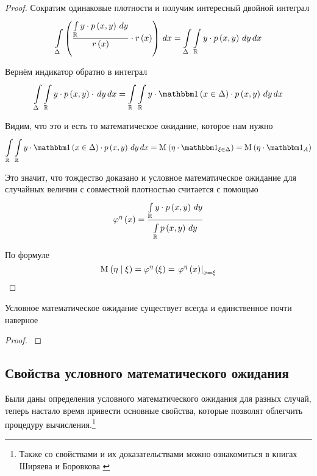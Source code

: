 \begin{proof}
Сократим одинаковые плотности и получим интересный двойной интеграл
$$\integral{\Delta}{}{x}{\left(
        \frac{\integral{\mathbb{R}}{}{y}{y \cdot \pdf{x,y}}}
            {r\left( x \right)}
        \cdot r\left( x \right) \right)}
    = \integral{\Delta}{}{x}{
        \integral{\mathbb{R}}{}{y}{y \cdot \pdf{x,y}}}$$

Вернём индикатор обратно в интеграл
$$\integral{\Delta}{}{x}{
    \integral{\mathbb{R}}{}{y}{y \cdot \pdf{x,y} \cdot}}
    =\integral{\mathbb{R}}{}{x}{
        \integral{\mathbb{R}}{}{y}{y \cdot \indicator{x \in \Delta}
            \cdot \pdf{x,y}}}$$

Видим, что это и есть то математическое ожидание, которое нам нужно
$$\integral{\mathbb{R}}{}{x}{
    \integral{\mathbb{R}}{}{y}{y \cdot \indicator{x \in \Delta}
        \cdot \pdf{x,y}}}
    = \mean{\left( \eta \cdot \indicatorof{\xi \in \Delta} \right)}
    = \mean{\left( \eta \cdot \indicatorof{A} \right)}$$

Это значит, что тождество доказано и условное математическое ожидание
для случайных величин с совместной плотностью считается с помощью
$$\varphi^{\eta}\left( x \right)
    = \frac{\integral{\mathbb{R}}{}{y}{y \cdot \pdf{x,y}}}
                {\integral{\mathbb{R}}{}{y}{\pdf{x,y}}}$$

По формуле
$$\mean{\left( \eta \mid \xi \right)}
    = \varphi^{\eta}\left( \xi \right)
    = \left. \varphi^{\eta}\left( x \right) \right|_{x=\xi}$$
\end{proof}

\begin{theorem}
    Условное математическое ожидание существует всегда
    и единственное почти наверное
\end{theorem}
\begin{proof}
\cite[стр.~142]{BorovkovMS}
\end{proof}

\subsection{Свойства условного математического ожидания}
Были даны определения условного математического ожидания для разных случай,
теперь настало время привести основные свойства,
которые позволят облегчить процедуру вычисления.\footnote{Также
со свойствами и их доказательствами можно ознакомиться в книгах
Ширяева \cite[стр.~270]{Shiryayev1} и Боровкова \cite[стр.~143]{BorovkovMS}
}

